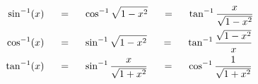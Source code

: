 \begin{align*}
\hspace{20mm} \sin^{-1}(x) \hspace{5mm} &= \hspace{5mm} \cos^{-1}\sqrt{1-x^2} \hspace{5mm} = \hspace{5mm}  \tan^{-1}\frac{x}{\sqrt{1-x^2}}\\
\hspace{20mm} \cos^{-1}(x) \hspace{5mm} &= \hspace{5mm} \sin^{-1}\sqrt{1-x^2} \hspace{5mm} = \hspace{5mm}  \tan^{-1}\frac{\sqrt{1-x^2}}{x}\\
\hspace{20mm} \tan^{-1}(x) \hspace{5mm} &= \hspace{5mm} \sin^{-1}\frac{x}{\sqrt{1+x^2}} \hspace{5mm} = \hspace{5mm}  \cos^{-1}\frac{1}{\sqrt{1+x^2}}
\end{align*}

